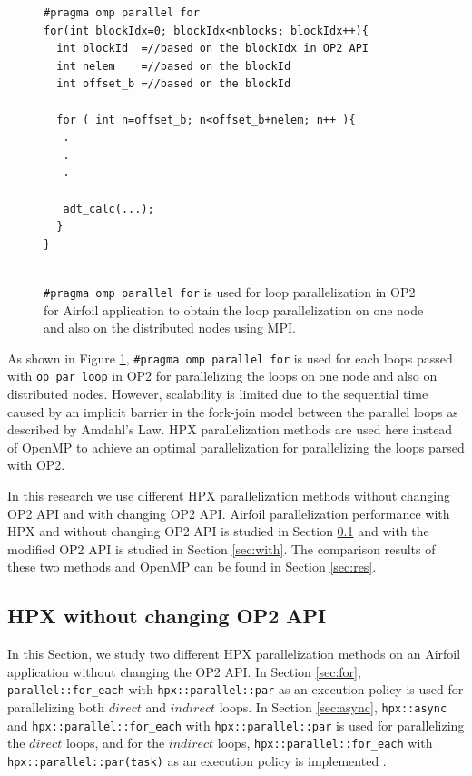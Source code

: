 \documentclass[conference]{IEEEtran}
\begin{document}
\begin{figure} [!h]
    \begin{lstlisting}
#pragma omp parallel for
for(int blockIdx=0; blockIdx<nblocks; blockIdx++){
  int blockId  =//based on the blockIdx in OP2 API
  int nelem    =//based on the blockId 
  int offset_b =//based on the blockId
        
  for ( int n=offset_b; n<offset_b+nelem; n++ ){
   .
   .
   .

   adt_calc(...);
  }
}
  
    \end{lstlisting}
    \caption{\small{\texttt{\#pragma omp parallel for} is used for loop parallelization in OP2 for Airfoil application to obtain the loop parallelization on one node and also on the distributed nodes using MPI.}}
    \label{l2}
\end{figure}


As shown in Figure \ref{l2}, \texttt{\#pragma omp parallel for} is used for each loops passed with \texttt{op\_par\_loop} in OP2 for parallelizing the loops on one node and also on distributed nodes. However, scalability is limited due to the sequential time caused by an implicit barrier in the fork-join model \cite{r23} between the parallel loops as described by Amdahl's Law. HPX parallelization methods are used here instead of OpenMP to achieve an optimal parallelization for parallelizing the loops parsed with OP2. 

In this research we use different HPX parallelization methods without changing OP2 API and with changing OP2 API. Airfoil parallelization performance with HPX and without changing OP2 API is studied in Section \ref{sec:without} and with the modified OP2 API is studied in Section \ref{sec:with}. The comparison results of these two methods and OpenMP can be found in Section \ref{sec:res}.

\subsection{\textbf{HPX without changing OP2 API}}
\label{sec:without}

In this Section, we study two different HPX parallelization methods on an Airfoil application without changing the OP2 API. In Section \ref{sec:for}, \texttt{parallel::for\_each} with \texttt{hpx::parallel::par} as an execution policy is used for parallelizing both $direct$ and $indirect$ loops. In Section \ref{sec:async}, \texttt{hpx::async} and \texttt{hpx::parallel::for\_each} with \texttt{hpx::parallel::par} is used for parallelizing the $direct$ loops, and for the $indirect$ loops, \texttt{hpx::parallel::for\_each} with \texttt{hpx::parallel::par(task)} as an execution policy is implemented . 
\end{document}
